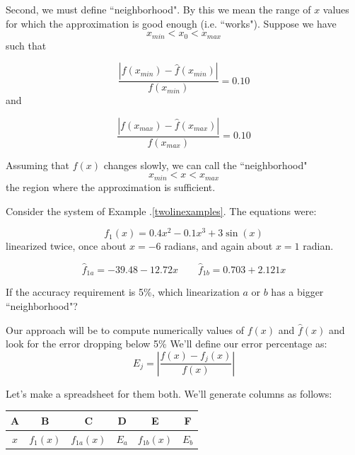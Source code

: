 Second, we must define ``neighborhood".    By this we mean the range of $x$ values for which the approximation is good enough (i.e. ``works").   Suppose we have
\[
x_{min} < x_0 < x_{max}
\]
such that

\[
\frac   {|f(x_{min})-\hat{f}(x_{min})| } {f(x_{min})} = 0.10
\]
and

\[
\frac   {|f(x_{max})-\hat{f}(x_{max})| } {f(x_{max})} = 0.10
\]

Assuming that $f(x)$ changes slowly, we can call the ``neighborhood"
\[
x_{min} < x < x_{max}
\]
the region where the approximation is sufficient.



\begin{Example}
Consider the system of Example \thechapter.\ref{twolinexamples}.  The equations were:

\[
f_1(x) = 0.4x^2 -0.1x^3 + 3\sin(x)
\]
 linearized twice, once about $x=-6$ radians, and again about $x=1$ radian.


\[
\hat{f}_{1a} =  -39.48-12.72x \qquad \hat{f}_{1b} =  0.703+2.121x
\]

If the accuracy requirement is 5\%, which linearization $a$ or $b$ has a bigger ``neighborhood"?


Our approach will be to compute numerically values of $f(x)$ and $\hat{f}(x)$ and look for the error dropping below 5\%
We'll define our error percentage as:
\[
E_j = \left| \frac {f(x) - f_j(x)} {f(x)}  \right |
\]

Let's make a spreadsheet for them both.  We'll generate columns as follows:

\begin{tabular}{|c|c|c|c|c|c|}\hline
A & B & C & D & E & F \\ \hline
$x$  & $f_1(x)$ & $f_{1a}(x) $  &  $E_a$ & $f_{1b}(x) $ &  $E_b$ \\
\hline
\end{tabular}



\end{Example}
